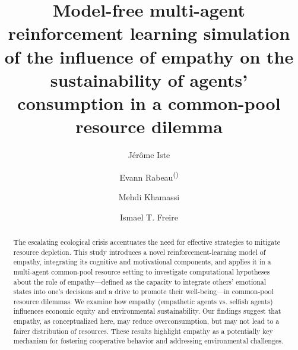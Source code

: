 \documentclass[runningheads]{llncs}
\begin{document}
%
\title{Model-free multi-agent reinforcement learning
simulation of the influence of empathy on the
sustainability of agents' consumption in a
common-pool resource dilemma}
%
%
\author{Jérôme Iste \and
Evann Rabeau\textsuperscript{(\Letter)} \and
Mehdi Khamassi \and
Ismael T. Freire
}
%
%

%
\maketitle              %
%
\begin{abstract}
The escalating ecological crisis accentuates the need for effective strategies to mitigate resource depletion. This study introduces a novel reinforcement-learning model of empathy, integrating its cognitive and motivational components, and applies it in a multi-agent common-pool resource setting to investigate computational hypotheses about the role of empathy---defined as the capacity to integrate others' emotional states into one's decisions and a drive to promote their well-being---in common-pool resource dilemmas. We examine how empathy (empathetic agents vs. selfish agents) influences economic equity and environmental sustainability. Our findings suggest that empathy, as conceptualized here, may reduce overconsumption, but may not lead to a fairer distribution of resources. These results highlight empathy as a potentially key mechanism for fostering cooperative behavior and addressing environmental challenges.

\end{abstract}
%
%
%
\newpage







\newpage

\end{document}
